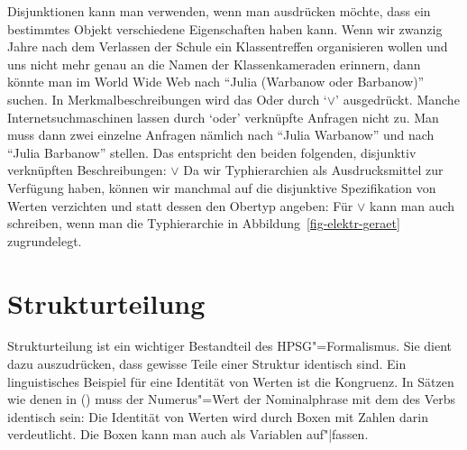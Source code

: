 Disjunktionen kann man verwenden, wenn man ausdrücken möchte, dass ein bestimmtes Objekt
verschiedene Eigenschaften haben kann. Wenn wir \zb zwanzig Jahre nach dem Verlassen der Schule
ein Klassentreffen organisieren wollen und uns nicht mehr genau an die Namen der Klassenkameraden erinnern,
dann könnte man im World Wide Web nach "`Julia (Warbanow oder Barbanow)"' suchen.
In Merkmalbeschreibungen wird das Oder durch `$\vee$'\is{$\vee$} ausgedrückt.
\ea
{}
\z
Manche Internetsuchmaschinen lassen durch `oder' verknüpfte Anfragen nicht zu. Man muss
dann zwei einzelne Anfragen nämlich nach "`Julia Warbanow"' und nach "`Julia Barbanow"'
stellen. Das entspricht den beiden folgenden, disjunktiv verknüpften Beschreibungen:
\ea
{} $\vee $
\z
Da wir Typhierarchien als Ausdrucksmittel zur Verfügung haben, können wir manchmal auf die
disjunktive Spezifikation von Werten verzichten und statt dessen den Obertyp angeben:
Für  $\vee$  kann man auch  schreiben,
wenn man die Typhierarchie in Abbildung~\vref{fig-elektr-geraet} zugrundelegt.%

\section{Strukturteilung}
\label{sec-strukturteilung}

Strukturteilung ist ein wichtiger Bestandteil des HPSG"=Formalismus. Sie dient
dazu auszudrücken, dass gewisse Teile einer Struktur identisch sind. Ein linguistisches
Beispiel für eine Identität von Werten ist die Kongruenz. In Sätzen wie denen in ()
muss der Numerus"=Wert der Nominalphrase mit dem des Verbs identisch sein:
\eal
{}
\zl
Die Identität von Werten wird durch Boxen mit Zahlen darin verdeutlicht.
Die Boxen kann man auch als Variablen auf"|fassen.

